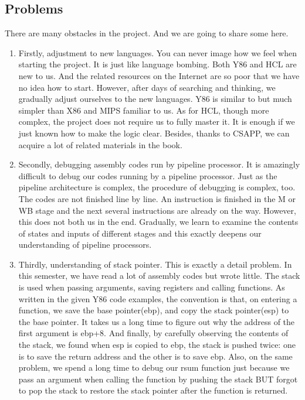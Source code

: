 \documentclass{article}
\begin{document}
\subsection{Problems}
There are many obstacles in the project. And we are going to share some here. \\
\begin{enumerate}

  \item Firstly, adjustment to new languages. You can never image how we feel when starting the project. It is just like language bombing. Both Y86 and HCL are new to us. And the related resources on the Internet are so poor that we have no idea how to start. However, after days of searching and thinking, we gradually adjust ourselves to the new languages. Y86 is similar to but much simpler than X86 and MIPS familiar to us. As for HCL, though more complex, the project does not require us to fully master it. It is enough if we just known how to make the logic clear. Besides, thanks to CSAPP, we can acquire a lot of related materials in the book.
  \item Secondly, debugging assembly codes run by pipeline processor. It is amazingly difficult to debug our codes running by a pipeline processor. Just as the pipeline architecture is complex, the procedure of debugging is complex, too. The codes are not finished line by line. An instruction is finished in the M or WB stage and the next several instructions are already on the way. However, this does not both us in the end. Gradually, we learn to examine the contents of states and inputs of different stages and this exactly deepens our understanding of pipeline processors.
  \item Thirdly, understanding of stack pointer. This is exactly a detail problem. In this semester, we have read a lot of assembly codes but wrote little. The stack is used when passing arguments, saving registers and calling functions. As written in the given Y86 code examples, the convention is that, on entering a function, we save the base pointer(ebp), and copy the stack pointer(esp) to the base pointer. It takes us a long time to figure out why the address of the first argument is ebp+8. And finally, by carefully observing the contents of the stack, we found when esp is copied to ebp, the stack is pushed twice: one is to save the return address and the other is to save ebp. Also, on the same problem, we spend a long time to debug our rsum function just because we pass an argument when calling the function by pushing the stack BUT forgot to pop the stack to restore the stack pointer after the function is returned.
\end{enumerate}
\end{document}
